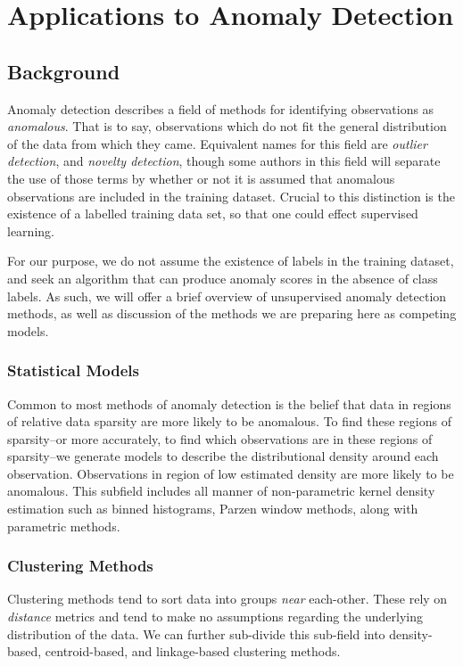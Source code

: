 \section{Applications to Anomaly Detection}
\subsection{Background}
Anomaly detection describes a field of methods for identifying observations as \emph{anomalous}.  That
  is to say, observations which do not fit the general distribution of the data from which they came.
  Equivalent names for this field are \emph{outlier detection}, and \emph{novelty detection}, though
  some authors in this field will separate the use of those terms by whether or not it is assumed
  that anomalous observations are included in the training dataset.  Crucial to this distinction is
  the existence of a labelled training data set, so that one could effect supervised learning.

For our purpose, we do not assume the existence of labels in the training dataset, and seek an
  algorithm that can produce anomaly scores in the absence of class labels. As such, we will offer
  a brief overview of unsupervised anomaly detection methods, as well as discussion of the methods
  we are preparing here as competing models.

\subsubsection{Statistical Models}
Common to most methods of anomaly detection is the belief that data in regions of relative data sparsity
  are more likely to be anomalous.   To find these regions of sparsity--or more accurately, to find
  which observations are in these regions of sparsity--we generate models to describe the distributional
  density around each observation.  Observations in region of low estimated density are more likely to
  be anomalous.  This subfield includes all manner of non-parametric kernel density estimation such
  as binned histograms, Parzen window methods, along with parametric methods.

\subsubsection{Clustering Methods}
Clustering methods tend to sort data into groups \emph{near} each-other.  These rely on \emph{distance}
  metrics and tend to make no assumptions regarding the underlying distribution of the data.  We can
  further sub-divide this sub-field into density-based, centroid-based, and linkage-based clustering
  methods.

